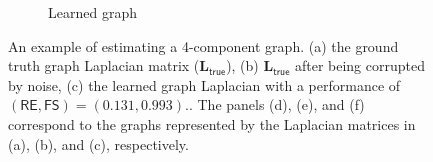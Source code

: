 \documentclass{article}
\begin{document}
\begin{figure}[!htb]
\begin{subfigure}[b]{0.3\textwidth}
            \caption{Learned graph}
    \end{subfigure}
        \caption{An example of estimating a 4-component graph. (a) the ground truth graph Laplacian matrix ($\mathbf{L}_{\mathsf{true}}$),
                 (b) $\mathbf{L}_{\mathsf{true}}$ after being corrupted by noise, (c) the learned graph Laplacian with a performance of
                 $(\mathsf{RE}, \mathsf{FS}) = (0.131, 0.993)$..
                 The panels (d), (e), and (f) correspond to the graphs represented by the Laplacian matrices in
                 (a), (b), and (c), respectively.}\label{fig:4-comp-graph}
        \label{fig:4-comp}
\end{figure}
\end{document}
